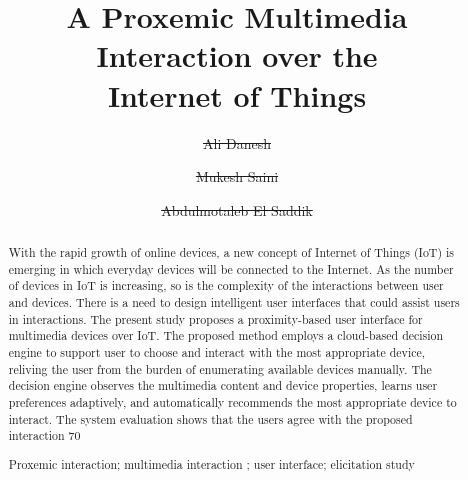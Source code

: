 \documentclass[runningheads,a4paper]{llncs}
\newcommand{\keywords}[1]{\par\addvspace\baselineskip
\noindent\keywordname\enspace\ignorespaces#1}
\providecommand{\DIFadd}[1]{{\protect\color{blue}\uwave{#1}}} %
\providecommand{\DIFdel}[1]{{\protect\color{red}\sout{#1}}}                      %
\providecommand{\DIFaddbegin}{} %
\providecommand{\DIFaddend}{} %
\providecommand{\DIFdelbegin}{} %
\providecommand{\DIFdelend}{} %
\newcommand{\DIFscaledelfig}{0.5}
\newlength{\DIFdelgraphicswidth} %
\newlength{\DIFdelgraphicsheight} %
\newcommand{\DIFaddincludegraphics}[2][]{{\color{blue}\fbox{\DIFOincludegraphics[#1]{#2}}}} %
\newcommand{\DIFdelincludegraphics}[2][]{%
\sbox{\DIFdelgraphicsbox}{\DIFOincludegraphics[#1]{#2}}%
\settoboxwidth{\DIFdelgraphicswidth}{\DIFdelgraphicsbox} %
\settoboxtotalheight{\DIFdelgraphicsheight}{\DIFdelgraphicsbox} %
\scalebox{\DIFscaledelfig}{%
\parbox[b]{\DIFdelgraphicswidth}{\usebox{\DIFdelgraphicsbox}\\[-\baselineskip] \rule{\DIFdelgraphicswidth}{0em}}\llap{\resizebox{\DIFdelgraphicswidth}{\DIFdelgraphicsheight}{%
\setlength{\unitlength}{\DIFdelgraphicswidth}%
\begin{picture}(1,1)%
\thicklines\linethickness{2pt} %
{\color[rgb]{1,0,0}\put(0,0){\framebox(1,1){}}}%
{\color[rgb]{1,0,0}\put(0,0){\line( 1,1){1}}}%
{\color[rgb]{1,0,0}\put(0,1){\line(1,-1){1}}}%
\end{picture}%
}\hspace*{3pt}}} %
} %
\DeclareRobustCommand{\DIFaddbegin}{\DIFOaddbegin \let\includegraphics\DIFaddincludegraphics} %
\DeclareRobustCommand{\DIFaddend}{\DIFOaddend \let\includegraphics\DIFOincludegraphics} %
\DeclareRobustCommand{\DIFdelbegin}{\DIFOdelbegin \let\includegraphics\DIFdelincludegraphics} %
\DeclareRobustCommand{\DIFdelend}{\DIFOaddend \let\includegraphics\DIFOincludegraphics} %
\begin{document}
\mainmatter  %

\title{A Proxemic Multimedia Interaction over the\\Internet of Things}


%
%
\author{\DIFdelbegin \DIFdel{Ali Danesh}\DIFdelend \DIFaddbegin \DIFadd{Himanshu}\DIFaddend %
\and \DIFdelbegin \DIFdel{Mukesh Saini}\DIFdelend \DIFaddbegin \DIFadd{Sonu}\DIFaddend \and  \DIFdelbegin \DIFdel{Abdulmotaleb El Saddik}\DIFdelend \DIFaddbegin \DIFadd{gurkaran}\DIFaddend }%


%
%

\maketitle


\begin{abstract}
With the rapid growth of online devices, a new concept of
Internet of Things (IoT) is emerging in which everyday devices will be connected to the Internet. As the number of devices in IoT is increasing, so is the complexity of the interactions between user and devices. There is a need to design intelligent user interfaces that could assist users in interactions. The present study proposes a proximity-based user interface for multimedia devices over IoT. The proposed method employs a cloud-based decision engine to support user to choose and interact with the most appropriate device, reliving the user from the burden of enumerating available devices manually. The decision engine observes the multimedia content and device properties, learns user preferences adaptively, and automatically recommends the most appropriate device to interact. The system evaluation shows that the users agree with the proposed interaction 70%
\keywords{Proxemic interaction; multimedia interaction ; user interface; elicitation study}
\end{abstract}
\end{document}
